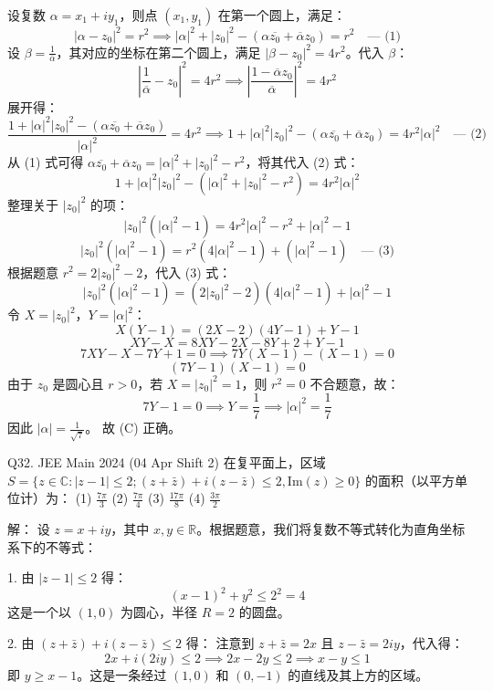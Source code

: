 \begin{questions}
\begin{solution}
设复数 $\alpha = x_1 + iy_1$，则点 $(x_1, y_1)$ 在第一个圆上，满足：
\[
|\alpha - z_0|^2 = r^2 \implies |\alpha|^2 + |z_0|^2 - (\alpha\overline{z_0} + \overline{\alpha}z_0) = r^2 \quad \text{--- (1)}
\]
设 $\beta = \frac{1}{\overline{\alpha}}$，其对应的坐标在第二个圆上，满足 $|\beta - z_0|^2 = 4r^2$。代入 $\beta$：
\[
\left| \frac{1}{\overline{\alpha}} - z_0 \right|^2 = 4r^2 \implies \left| \frac{1 - \overline{\alpha}z_0}{\overline{\alpha}} \right|^2 = 4r^2
\]
展开得：
\[
\frac{1 + |\alpha|^2|z_0|^2 - (\alpha\overline{z_0} + \overline{\alpha}z_0)}{|\alpha|^2} = 4r^2 \implies 1 + |\alpha|^2|z_0|^2 - (\alpha\overline{z_0} + \overline{\alpha}z_0) = 4r^2|\alpha|^2 \quad \text{--- (2)}
\]
从 (1) 式可得 $\alpha\overline{z_0} + \overline{\alpha}z_0 = |\alpha|^2 + |z_0|^2 - r^2$，将其代入 (2) 式：
\[
1 + |\alpha|^2|z_0|^2 - (|\alpha|^2 + |z_0|^2 - r^2) = 4r^2|\alpha|^2
\]
整理关于 $|z_0|^2$ 的项：
\[
|z_0|^2(|\alpha|^2 - 1) = 4r^2|\alpha|^2 - r^2 + |\alpha|^2 - 1
\]
\[
|z_0|^2(|\alpha|^2 - 1) = r^2(4|\alpha|^2 - 1) + (|\alpha|^2 - 1) \quad \text{--- (3)}
\]
根据题意 $r^2 = 2|z_0|^2 - 2$，代入 (3) 式：
\[
|z_0|^2(|\alpha|^2 - 1) = (2|z_0|^2 - 2)(4|\alpha|^2 - 1) + |\alpha|^2 - 1
\]
令 $X = |z_0|^2$，$Y = |\alpha|^2$：
\[
X(Y - 1) = (2X - 2)(4Y - 1) + Y - 1
\]
\[
XY - X = 8XY - 2X - 8Y + 2 + Y - 1
\]
\[
7XY - X - 7Y + 1 = 0 \implies 7Y(X - 1) - (X - 1) = 0
\]
\[
(7Y - 1)(X - 1) = 0
\]
由于 $z_0$ 是圆心且 $r > 0$，若 $X = |z_0|^2 = 1$，则 $r^2 = 0$ 不合题意，故：
\[
7Y - 1 = 0 \implies Y = \frac{1}{7} \implies |\alpha|^2 = \frac{1}{7}
\]
因此 $|\alpha| = \frac{1}{\sqrt{7}}$。
故 (C) 正确。
\end{solution}

    \question Q32. JEE Main 2024 (04 Apr Shift 2)
在复平面上，区域 $S = \{z \in \mathbb{C} : |z - 1| \leq 2; (z + \bar{z}) + i(z - \bar{z}) \leq 2, \text{Im}(z) \geq 0\}$ 的面积（以平方单位计）为：
(1) $\frac{7\pi}{3}$ \quad (2) $\frac{7\pi}{4}$ \quad (3) $\frac{17\pi}{8}$ \quad (4) $\frac{3\pi}{2}$

\begin{solution}
解：
设 $z = x + iy$，其中 $x, y \in \mathbb{R}$。根据题意，我们将复数不等式转化为直角坐标系下的不等式：

1. 由 $|z - 1| \leq 2$ 得：
\[
(x - 1)^2 + y^2 \leq 2^2 = 4
\]
这是一个以 $(1, 0)$ 为圆心，半径 $R = 2$ 的圆盘。

2. 由 $(z + \bar{z}) + i(z - \bar{z}) \leq 2$ 得：
注意到 $z + \bar{z} = 2x$ 且 $z - \bar{z} = 2iy$，代入得：
\[
2x + i(2iy) \leq 2 \implies 2x - 2y \leq 2 \implies x - y \leq 1
\]
即 $y \geq x - 1$。这是一条经过 $(1, 0)$ 和 $(0, -1)$ 的直线及其上方的区域。


\end{solution}
\end{questions}
